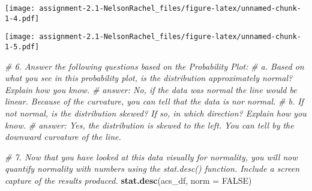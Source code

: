 \documentclass[
]{article}
\newenvironment{Shaded}{\begin{snugshade}}{\end{snugshade}}
\newcommand{\CommentTok}[1]{\textcolor[rgb]{0.56,0.35,0.01}{\textit{#1}}}
\newcommand{\DataTypeTok}[1]{\textcolor[rgb]{0.13,0.29,0.53}{#1}}
\newcommand{\KeywordTok}[1]{\textcolor[rgb]{0.13,0.29,0.53}{\textbf{#1}}}
\newcommand{\NormalTok}[1]{#1}
\newcommand{\OperatorTok}[1]{\textcolor[rgb]{0.81,0.36,0.00}{\textbf{#1}}}
\newcommand{\OtherTok}[1]{\textcolor[rgb]{0.56,0.35,0.01}{#1}}
\begin{document}
\texttt{[image: assignment-2.1-NelsonRachel\_files/figure-latex/unnamed-chunk-1-4.pdf]}

\begin{Shaded}
\end{Shaded}

\texttt{[image: assignment-2.1-NelsonRachel\_files/figure-latex/unnamed-chunk-1-5.pdf]}

\begin{Shaded}
\begin{Highlighting}[]
\CommentTok{# 6. Answer the following questions based on the Probability Plot:}
\CommentTok{#   a. Based on what you see in this probability plot, is the distribution approximately normal? Explain how you know.}
\CommentTok{#       answer: No, if the data was normal the line would be linear. Because of the curvature, you can tell that the data is nor normal.}
\CommentTok{#   b. If not normal, is the distribution skewed? If so, in which direction? Explain how you know.}
\CommentTok{#       answer: Yes, the distribution is skewed to the left. You can tell by the downward curvature of the line. }

\CommentTok{# 7. Now that you have looked at this data visually for normality, you will now quantify normality with numbers using the stat.desc() function. Include a screen capture of the results produced.}
\KeywordTok{stat.desc}\NormalTok{(acs_df,  }\DataTypeTok{norm =} \OtherTok{FALSE}\NormalTok{) }
\end{Highlighting}
\end{Shaded}
\end{document}
